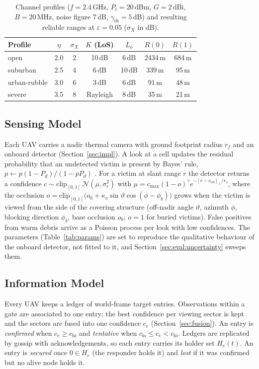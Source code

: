 \begin{table}[t]\centering\caption{Channel profiles ($f=2.4$\,GHz, $P_t=20$\,dBm, $G=2$\,dBi, $B=20$\,MHz, noise figure 7\,dB,
$\gamma_{\mathrm{th}}=5$\,dB) and resulting reliable ranges at $\varepsilon=0.05$ ($\sigma_X$ in dB).}\label{tab:channel}
\begin{tabular}{lcccccc}\toprule
Profile & $\eta$ & $\sigma_X$ & $K$ (LoS) & $L_o$ & $R(0)$ & $R(1)$\\\midrule
open & 2.0 & 2 & 10\,dB & 6\,dB & 2434\,m & 684\,m\\
suburban & 2.5 & 4 & 6\,dB & 10\,dB & 339\,m & 95\,m\\
urban-rubble & 3.0 & 6 & 3\,dB & 6\,dB & 91\,m & 48\,m\\
severe & 3.5 & 8 & Rayleigh & 8\,dB & 35\,m & 21\,m\\\bottomrule
\end{tabular}\end{table}

\subsection{Sensing Model}
Each UAV carries a nadir thermal camera with ground footprint radius $r_f$ and an onboard
detector (Section~\ref{sec:impl}). A look at a cell updates the residual probability that an
undetected victim is present by Bayes' rule, $p\leftarrow p(1-P_d)/(1-pP_d)$ \cite{stone1975}. For a
victim at slant range $r$ the detector returns a confidence
$c\sim\mathrm{clip}_{[0,1]}\,\mathcal{N}(\mu,\sigma_c^2)$ with
$\mu=c_{\max}(1-o)^{\gamma}e^{-[r-r_{\mathrm{ref}}]_+/r_s}$, where the occlusion
$o=\mathrm{clip}_{[0,1]}\big(o_0+\kappa_o\sin\vartheta\cos(\phi-\phi_b)\big)$ grows when the victim is
viewed from the side of the covering structure (off-nadir angle $\vartheta$, azimuth $\phi$, blocking
direction $\phi_b$, base occlusion $o_0$; $o=1$ for buried victims). False positives from warm
debris arrive as a Poisson process per look with low confidences. The parameters
(Table~\ref{tab:params}) are set to reproduce the qualitative behaviour of the onboard detector, not
fitted to it, and Section~\ref{sec:eval:uncertainty} sweeps them.

\subsection{Information Model}
Every UAV keeps a ledger of world-frame target entries. Observations within a gate are
associated to one entry; the best confidence per viewing sector is kept and the sectors are fused
into one confidence $c_e$ (Section~\ref{sec:fusion}). An entry is \emph{confirmed} when
$c_e\ge c_{\mathrm{hi}}$ and \emph{tentative} when $c_{\mathrm{lo}}\le c_e<c_{\mathrm{hi}}$.
Ledgers are replicated by gossip with acknowledgements, so each entry carries its holder set
$H_e(t)$. An entry is \emph{secured} once $0\in H_e$ (the responder holds it) and \emph{lost}
if it was confirmed but no alive node holds it.

